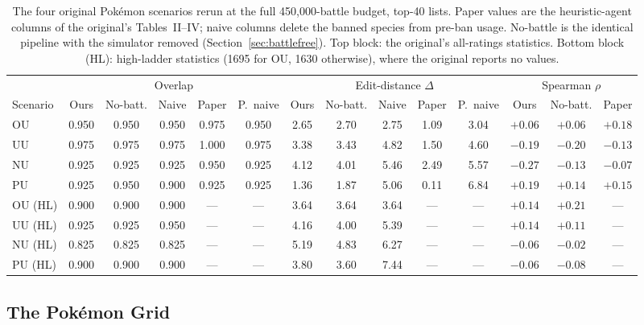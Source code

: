 \documentclass[journal]{IEEEtran}
\newcommand{\pkmn}{Pok\'emon}
\begin{document}
\begin{table}[t]
\caption{The four original \pkmn{} scenarios rerun at the full
450{,}000-battle budget, top-40 lists. Paper values are the heuristic-agent
columns of the original's Tables~II--IV; naive columns delete the banned
species from pre-ban usage. No-battle is the identical pipeline with the
simulator removed (Section~\ref{sec:battlefree}). Top block: the original's
all-ratings statistics. Bottom block (HL): high-ladder statistics (1695 for
OU, 1630 otherwise), where the original reports no values.}
\label{tab:gen8}
\centering
\begin{tabular}{@{}l ccccc ccccc ccc@{}}
\toprule
& \multicolumn{5}{c}{Overlap} & \multicolumn{5}{c}{Edit-distance $\Delta$} & \multicolumn{3}{c}{Spearman $\rho$} \\
\cmidrule(lr){2-6} \cmidrule(lr){7-11} \cmidrule(lr){12-14}
Scenario & Ours & No-batt. & Naive & Paper & P.\ naive & Ours & No-batt. & Naive & Paper & P.\ naive & Ours & No-batt. & Paper \\
\midrule
OU & 0.950 & 0.950 & 0.950 & 0.975 & 0.950 & 2.65 & 2.70 & 2.75 & 1.09 & 3.04 & $+0.06$ & $+0.06$ & $+0.18$ \\
UU & 0.975 & 0.975 & 0.975 & 1.000 & 0.975 & 3.38 & 3.43 & 4.82 & 1.50 & 4.60 & $-0.19$ & $-0.20$ & $-0.13$ \\
NU & 0.925 & 0.925 & 0.925 & 0.950 & 0.925 & 4.12 & 4.01 & 5.46 & 2.49 & 5.57 & $-0.27$ & $-0.13$ & $-0.07$ \\
PU & 0.925 & 0.950 & 0.900 & 0.925 & 0.925 & 1.36 & 1.87 & 5.06 & 0.11 & 6.84 & $+0.19$ & $+0.14$ & $+0.15$ \\
\midrule
OU (HL) & 0.900 & 0.900 & 0.900 & --- & --- & 3.64 & 3.64 & 3.64 & --- & --- & $+0.14$ & $+0.21$ & --- \\
UU (HL) & 0.925 & 0.925 & 0.950 & --- & --- & 4.16 & 4.00 & 5.39 & --- & --- & $+0.14$ & $+0.11$ & --- \\
NU (HL) & 0.825 & 0.825 & 0.825 & --- & --- & 5.19 & 4.83 & 6.27 & --- & --- & $-0.06$ & $-0.02$ & --- \\
PU (HL) & 0.900 & 0.900 & 0.900 & --- & --- & 3.80 & 3.60 & 7.44 & --- & --- & $-0.06$ & $-0.08$ & --- \\
\bottomrule
\end{tabular}
\end{table}

\subsection{The \pkmn{} Grid}
\end{document}

